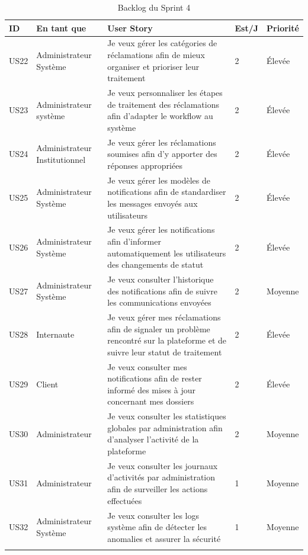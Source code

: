 \begin{longtable}{|p{1cm}|p{3cm}|p{7cm}|p{1cm}|p{2cm}|}
\hline
\rowcolor{orange!30}
\textbf{ID} & \textbf{En tant que} & \textbf{User Story} & \textbf{Est/J} & \textbf{Priorité} \\
\hline
\endfirsthead

 

US22 & Administrateur Système & Je veux gérer les catégories de réclamations afin de mieux organiser et prioriser leur traitement & 2 & Élevée \\ \hline
US23 & Administrateur système & Je veux personnaliser les étapes de traitement des réclamations afin d'adapter le workflow au système & 2 & Élevée \\ \hline
US24 & Administrateur Institutionnel & Je veux gérer les réclamations soumises afin d'y apporter des réponses appropriées & 2 & Élevée \\ \hline
US25 & Administrateur Système & Je veux gérer les modèles de notifications afin de standardiser les messages envoyés aux utilisateurs & 2 & Élevée \\ \hline
US26 & Administrateur Système & Je veux gérer les notifications afin d'informer automatiquement les utilisateurs des changements de statut & 2 & Élevée \\ \hline
US27 & Administrateur Système & Je veux consulter l'historique des notifications afin de suivre les communications envoyées & 2 & Moyenne \\ \hline
US28 & Internaute & Je veux gérer mes réclamations afin de signaler un problème rencontré sur la plateforme et de suivre leur statut de traitement & 2 & Élevée \\ \hline
US29 & Client & Je veux consulter mes notifications afin de rester informé des mises à jour concernant mes dossiers & 2 & Élevée \\ \hline
US30 & Administrateur & Je veux consulter les statistiques globales par administration afin d'analyser l'activité de la plateforme & 2 & Moyenne \\ \hline
US31 & Administrateur & Je veux consulter les journaux d'activités par administration afin de surveiller les actions effectuées & 1 & Moyenne \\ \hline
US32 & Administrateur Système & Je veux consulter les logs système afin de détecter les anomalies et assurer la sécurité & 1 & Moyenne \\ \hline

\rowcolor{white}
\caption{Backlog du Sprint 4}
\label{tab:user-stories-sprint4}
\end{longtable}

